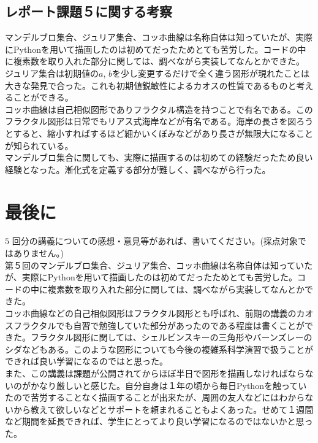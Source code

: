 \documentclass[dvipdfmx,uplatex]{jsarticle}
\begin{document}
\newpage

\subsection{レポート課題５に関する考察}
マンデルブロ集合、ジュリア集合、コッホ曲線は名称自体は知っていたが、実際にPythonを用いて描画したのは初めてだったためとても苦労した。コードの中に複素数を取り入れた部分に関しては、調べながら実装してなんとかできた。\\
ジュリア集合は初期値の$a$, $b$を少し変更するだけで全く違う図形が現れたことは大きな発見で合った。これも初期値鋭敏性によるカオスの性質であるものと考えることができる。\\
コッホ曲線は自己相似図形でありフラクタル構造を持つことで有名である。このフラクタル図形は日常でもリアス式海岸などが有名である。海岸の長さを図ろうとすると、縮小すればするほど細かいくぼみなどがあり長さが無限大になることが知られている。\\
マンデルブロ集合に関しても、実際に描画するのは初めての経験だったため良い経験となった。漸化式を定義する部分が難しく、調べながら行った。\\

\newpage

\section{最後に}
$5$ 回分の講義についての感想・意見等があれば、書いてください。(採点対象ではありません。)\\

第５回のマンデルブロ集合、ジュリア集合、コッホ曲線は名称自体は知っていたが、実際にPythonを用いて描画したのは初めてだったためとても苦労した。コードの中に複素数を取り入れた部分に関しては、調べながら実装してなんとかできた。\\
コッホ曲線などの自己相似図形はフラクタル図形とも呼ばれ、前期の講義のカオスフラクタルでも自習で勉強していた部分があったのである程度は書くことができた。フラクタル図形に関しては、シェルビンスキーの三角形やバーンズレーのシダなどもある。このような図形についても今後の複雑系科学演習で扱うことができれば良い学習になるのではと思った。\\
また、この講義は課題が公開されてからほぼ半日で図形を描画しなければならないのがかなり厳しいと感じた。自分自身は１年の頃から毎日Pythonを触っていたので苦労することなく描画することが出来たが、周囲の友人などにはわからないから教えて欲しいなどとサポートを頼まれることもよくあった。せめて１週間など期間を延長できれば、学生にとってより良い学習になるのではないかと思った。\\
\end{document}
